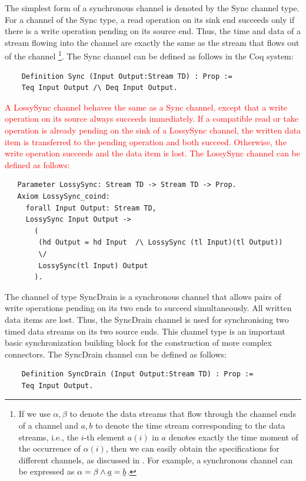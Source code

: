 \documentclass{llncs}
\newcommand{\redt}[1]{\textcolor{red}{#1}}
\begin{document}
The simplest form of a synchronous channel is denoted by the Sync channel type. For a channel of the Sync type, a read operation on
its sink end succeeds only if there is a write operation pending on its source end. Thus, the time and data of a stream flowing
into the channel are exactly the same as the stream that flows out of the channel
\footnote{If we use $\alpha,\beta$ to denote the data streams that flow through the channel ends of a channel and $a,b$ to denote the time stream corresponding to the data streams, i.e., the $i$-th element $a(i)$ in $a$ denotes exactly the time moment of the occurrence of $\alpha(i)$, then we can easily obtain the specifications for different channels, as discussed in \cite{Sun12,SAA+12}. For example, a synchronous channel can be expressed as $\alpha=\beta \wedge \emph{a}=\emph{b}$.}.
The Sync channel can be defined as follows in the Coq system:
\begin{verbatim}
    Definition Sync (Input Output:Stream TD) : Prop :=
    Teq Input Output /\ Deq Input Output.
\end{verbatim}

\redt{
A LossySync channel behaves the same as a Sync channel, except that a write operation on its source always succeeds immediately. If a compatible read or take operation is already pending on the sink of a LossySync channel, the written data item is transferred to the pending operation and both succeed. Otherwise, the write operation succeeds and the data item is lost. The LossySync channel can be defined as follows:}
\begin{verbatim}
   Parameter LossySync: Stream TD -> Stream TD -> Prop.
   Axiom LossySync_coind: 
     forall Input Output: Stream TD,
     LossySync Input Output ->
       (
        (hd Output = hd Input  /\ LossySync (tl Input)(tl Output))
        \/
        LossySync(tl Input) Output
       ).
\end{verbatim}

The channel of type SyncDrain is a synchronous channel that allows pairs of write operations pending on its two ends to succeed simultaneously. All written data items are lost. Thus, the SyncDrain channel is used for synchronising two timed data streams on its two source ends. This channel type is an important basic synchronization building block for the construction of more complex connectors. The SyncDrain channel can be defined as follows:
\begin{verbatim}
    Definition SyncDrain (Input Output:Stream TD) : Prop :=
    Teq Input Output.
\end{verbatim}
\end{document}
